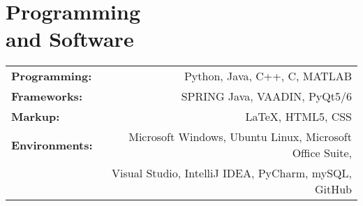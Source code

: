 \section{\sc Programming\\ and Software}
\begin{tabular}{lr}
	\textbf{Programming:} & Python, Java, C++, C, MATLAB\\
	\textbf{Frameworks:} & SPRING Java, VAADIN, PyQt5/6\\
	\textbf{Markup:} & \LaTeX, HTML5, CSS\\
	\textbf{Environments:} & Microsoft Windows, Ubuntu Linux, Microsoft Office Suite,\\
	& Visual Studio, IntelliJ IDEA, PyCharm, mySQL, GitHub
\end{tabular}